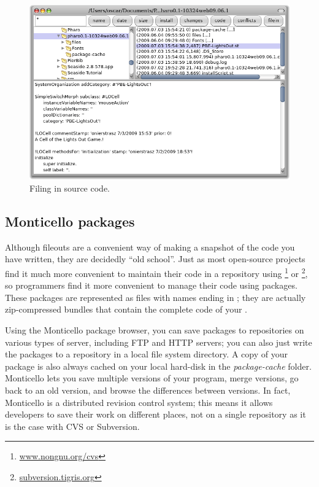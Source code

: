 \documentclass[a4paper,10pt,twoside]{book}
\begin{document}

\begin{figure}[ht]
\centerline {\includegraphics[width=\textwidth]{FileIn}}
\caption{Filing in \pharo source code.
\label{fig:filein}}
\end{figure}

\subsection{Monticello packages}
Although fileouts are a convenient way of making a snapshot of the code you have written, they are decidedly ``old school''.
Just as most open-source projects find it much more convenient to maintain their code in a repository using \footnote{\url{www.nongnu.org/cvs}} or \footnote{\url{subversion.tigris.org}},
so \pharo programmers find it more convenient to manage their code using  packages. 
These packages are represented as files with names ending in ; they are actually zip-compressed bundles that contain the complete code of your .

Using the Monticello package browser, you can save packages to repositories on various types of server, including FTP and HTTP servers; you can also just write the packages to a repository in a local file system directory.
A copy of your package is also always cached on your local hard-disk in the \emph{package-cache} folder. 
Monticello lets you save multiple versions of your program, merge versions, go back to an old version, and browse the differences between versions. 
In fact, Monticello is a distributed revision control system; this means it allows developers to save their work on different places, not on a single repository as it is the case with CVS or Subversion.
\end{document}
